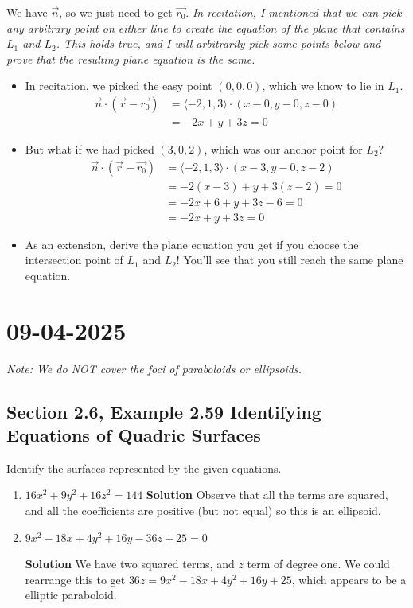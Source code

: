 \documentclass[]{mangos-musings}
\begin{document}
We have $\vec{n}$, so we just need to get $\vec{r_0}$. 
\textit{In recitation, I mentioned that we can pick any arbitrary point on either line to create the equation of the plane that contains $L_1$ and $L_2$. This holds true, and I will arbitrarily pick some points below and prove that the resulting plane equation is the same.} 
\begin{itemize}
  \item In recitation, we picked the easy point $(0, 0, 0)$, which we know to lie in $L_1$. 
  \begin{align*}
    \vec{n} \cdot (\vec{r} - \vec{r_0}) &= \langle -2, 1, 3 \rangle \cdot (x-0, y-0, z-0) 
    \\ &= -2x + y + 3z = 0
  \end{align*}
  \item But what if we had picked $(3, 0, 2)$, which was our anchor point for $L_2$?
  \begin{align*}
    \vec{n} \cdot (\vec{r} - \vec{r_0}) &= \langle -2, 1, 3 \rangle \cdot (x-3, y-0, z-2) 
    \\ &= -2(x-3) + y + 3(z-2) = 0
    \\ &= -2x + 6 + y + 3z - 6 = 0
    \\ &= -2x + y + 3z = 0 \tag{the $6$'s cancel!}
  \end{align*}
  \item As an extension, derive the plane equation you get if you choose the intersection point of $L_1$ and $L_2$! You'll see that you still reach the same plane equation.
\end{itemize}


\newpage
\section*{09-04-2025}
\textit{Note: We do NOT cover the foci of paraboloids or ellipsoids.}

\subsection*{Section 2.6, Example 2.59 Identifying Equations of Quadric Surfaces}
Identify the surfaces represented by the given equations.
\begin{enumerate}[label=(\alph*)]
  \item $16x^2 + 9y^2 + 16z^2 = 144$
  \textbf{Solution}
  Observe that all the terms are squared, and all the coefficients are positive (but not equal) so this is an ellipsoid.

  \item $9x^2 - 18x + 4y^2 + 16y - 36z + 25 = 0$

  \textbf{Solution}
  We have two squared terms, and $z$ term of degree one. We could rearrange this to get $36z = 9x^2 - 18x + 4y^2 + 16y + 25$, which appears to be a elliptic paraboloid.
\end{enumerate}
\end{document}
